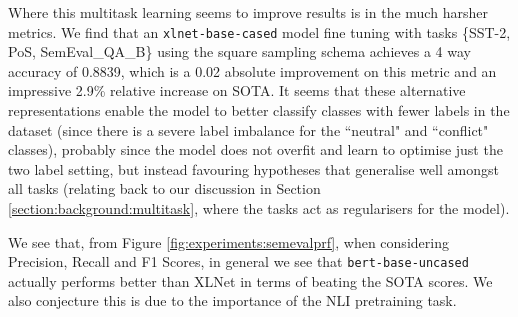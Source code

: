 Where this multitask learning seems to improve results is in the much harsher metrics. We find that an \texttt{xlnet-base-cased} model fine tuning with tasks \{SST-2, PoS, SemEval\_QA\_B\} using the square sampling schema achieves a 4 way accuracy of 0.8839, which is a 0.02 absolute improvement on this metric and an impressive 2.9\% relative increase on SOTA. It seems that these alternative representations enable the model to better classify classes with fewer labels in the dataset (since there is a severe label imbalance for the ``neutral" and ``conflict" classes), probably since the model does not overfit and learn to optimise just the two label setting, but instead favouring hypotheses that generalise well amongst all tasks (relating back to our discussion in Section \ref{section:background:multitask}, where the tasks act as regularisers for the model).

We see that, from Figure \ref{fig:experiments:semevalprf}, when considering Precision, Recall and F1 Scores, in general we see that \texttt{bert-base-uncased} actually performs better than XLNet in terms of beating the SOTA scores. We also conjecture this is due to the importance of the NLI pretraining task.

